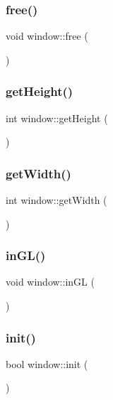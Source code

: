 \subsubsection{\texorpdfstring{free()}{free()}}
{\footnotesize\ttfamily void window\+::free (\begin{DoxyParamCaption}{ }\end{DoxyParamCaption})}

\mbox{\label{classwindow_a3c0dbe119eb9fee0bc0dee6e6e11e11d}} 
\subsubsection{\texorpdfstring{get\+Height()}{getHeight()}}
{\footnotesize\ttfamily int window\+::get\+Height (\begin{DoxyParamCaption}{ }\end{DoxyParamCaption})}

\mbox{\label{classwindow_a5559b157ba1490b30a8f378ad93ea6c5}} 
\subsubsection{\texorpdfstring{get\+Width()}{getWidth()}}
{\footnotesize\ttfamily int window\+::get\+Width (\begin{DoxyParamCaption}{ }\end{DoxyParamCaption})}

\mbox{\label{classwindow_a06c98cfaea6fffa00d23c3253a8a8cfc}} 
\subsubsection{\texorpdfstring{in\+G\+L()}{inGL()}}
{\footnotesize\ttfamily void window\+::in\+GL (\begin{DoxyParamCaption}{ }\end{DoxyParamCaption})}

\mbox{\label{classwindow_ae08987fb6d4aa85ef942118cee29db3c}} 
\subsubsection{\texorpdfstring{init()}{init()}}
{\footnotesize\ttfamily bool window\+::init (\begin{DoxyParamCaption}{ }\end{DoxyParamCaption})}

